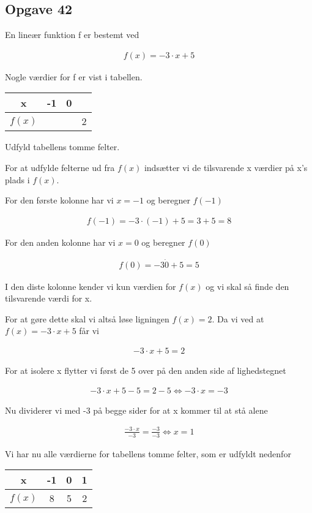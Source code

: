 \subsection{Opgave 42}

En lineær funktion f er bestemt ved 

\begin{align*}
    f(x) = -3\cdot x + 5
\end{align*}

Nogle værdier for f er vist i tabellen.

\begin{tabular}{|c|c|c|c|}
    \hline
    x & -1 & 0 & \\\hline
    $f(x)$ &  &  & 2 \\\hline 
\end{tabular}

Udfyld tabellens tomme felter.

\ans

For at udfylde felterne ud fra $f(x)$ indsætter vi de tilsvarende x værdier på x's plads i $f(x)$.

For den første kolonne har vi $x = -1$ og beregner $f(-1)$

\begin{align*}
    f(-1) = -3\cdot (-1) + 5 = 3 + 5 = 8
\end{align*}

For den anden kolonne har vi $x = 0$ og beregner $f(0)$

\begin{align*}
    f(0) = -3\dot 0 + 5 = 5
\end{align*}

I den diste kolonne kender vi kun værdien for $f(x)$ og vi skal så finde den tilsvarende værdi for x.

For at gøre dette skal vi altså løse ligningen $f(x) = 2$. Da vi ved at $f(x) = -3\cdot x + 5$ får vi

\begin{align*}
    -3\cdot x + 5 = 2 
\end{align*}

For at isolere x flytter vi først de 5 over på den anden side af lighedstegnet

\begin{align*}
    -3\cdot x + 5 - 5 = 2 - 5 \Leftrightarrow -3\cdot x = -3
\end{align*}

Nu dividerer vi med -3 på begge sider for at x kommer til at stå alene

\begin{align*}
    \frac{-3\cdot x}{-3} = \frac{-3}{-3} \Leftrightarrow x = 1
\end{align*}

Vi har nu alle værdierne for tabellens tomme felter, som er udfyldt nedenfor

\begin{tabular}{|c|c|c|c|}
    \hline
    x & -1 & 0 & 1 \\\hline
    $f(x)$ & 8 & 5 & 2 \\\hline 
\end{tabular}